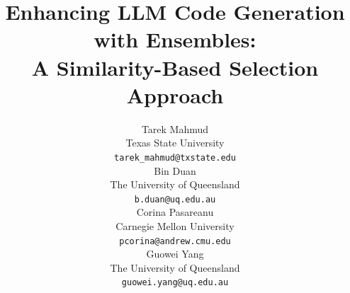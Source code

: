 \documentclass{article}
\begin{document}
\title{Enhancing LLM Code Generation with Ensembles: \\ A Similarity-Based Selection Approach}

\author{
 Tarek Mahmud \\
  Texas State University\\
  \texttt{tarek\_mahmud@txstate.edu} \\
   \And
 Bin Duan \\
  The University of Queensland \\ %
  \texttt{b.duan@uq.edu.au} \\
  \And
 Corina Pasareanu \\
  Carnegie Mellon University \\ %
  \texttt{pcorina@andrew.cmu.edu} \\
  \And
 Guowei Yang \\
  The University of Queensland \\
  \texttt{guowei.yang@uq.edu.au} \\
}


\end{document}
